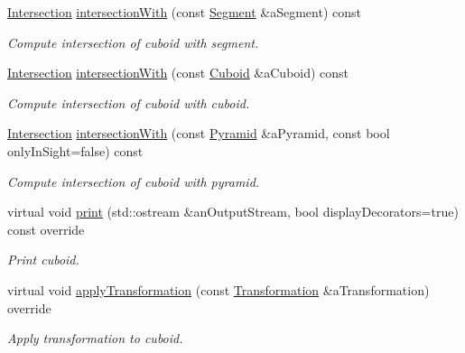 \begin{DoxyCompactItemize}
\hyperlink{classostk_1_1math_1_1geom_1_1d3_1_1_intersection}{Intersection} \hyperlink{classostk_1_1math_1_1geom_1_1d3_1_1objects_1_1_cuboid_a13752ceb5d818419d6325cf4d2efd34e}{intersection\+With} (const \hyperlink{classostk_1_1math_1_1geom_1_1d3_1_1objects_1_1_segment}{Segment} \&a\+Segment) const
\begin{DoxyCompactList}\small\item\em Compute intersection of cuboid with segment. \end{DoxyCompactList}\item 
\hyperlink{classostk_1_1math_1_1geom_1_1d3_1_1_intersection}{Intersection} \hyperlink{classostk_1_1math_1_1geom_1_1d3_1_1objects_1_1_cuboid_af945b79b88ec89ae5c2a9f9624668cb9}{intersection\+With} (const \hyperlink{classostk_1_1math_1_1geom_1_1d3_1_1objects_1_1_cuboid}{Cuboid} \&a\+Cuboid) const
\begin{DoxyCompactList}\small\item\em Compute intersection of cuboid with cuboid. \end{DoxyCompactList}\item 
\hyperlink{classostk_1_1math_1_1geom_1_1d3_1_1_intersection}{Intersection} \hyperlink{classostk_1_1math_1_1geom_1_1d3_1_1objects_1_1_cuboid_a583a87ed4da890236e672e4dd3fbcbab}{intersection\+With} (const \hyperlink{classostk_1_1math_1_1geom_1_1d3_1_1objects_1_1_pyramid}{Pyramid} \&a\+Pyramid, const bool only\+In\+Sight=false) const
\begin{DoxyCompactList}\small\item\em Compute intersection of cuboid with pyramid. \end{DoxyCompactList}\item 
virtual void \hyperlink{classostk_1_1math_1_1geom_1_1d3_1_1objects_1_1_cuboid_a6ea70c4469116cc9f512e4c1a0e49016}{print} (std\+::ostream \&an\+Output\+Stream, bool display\+Decorators=true) const override
\begin{DoxyCompactList}\small\item\em Print cuboid. \end{DoxyCompactList}\item 
virtual void \hyperlink{classostk_1_1math_1_1geom_1_1d3_1_1objects_1_1_cuboid_aaa90106ccf8120f854bdcf0f824e5610}{apply\+Transformation} (const \hyperlink{classostk_1_1math_1_1geom_1_1d3_1_1_transformation}{Transformation} \&a\+Transformation) override
\begin{DoxyCompactList}\small\item\em Apply transformation to cuboid. \end{DoxyCompactList}\end{DoxyCompactItemize}
